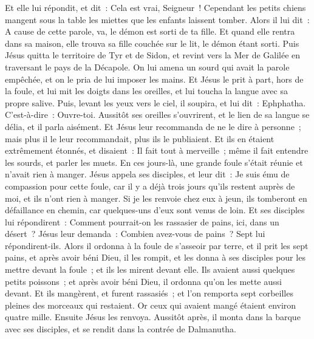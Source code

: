 \begin{multicols}{2}
Et elle lui répondit, et dit~: Cela est vrai, Seigneur~! Cependant les petits chiens mangent sous la table les miettes que les enfants laissent tomber.
Alors il lui dit~: A cause de cette parole, va, le démon est sorti de ta fille.
Et quand elle rentra dans sa maison, elle trouva sa fille couchée sur le lit, le démon étant sorti.
Puis Jésus quitta le territoire de Tyr et de Sidon, et revint vers la Mer de Galilée en traversant le pays de la Décapole.
On lui amena un sourd qui avait la parole empêchée, et on le pria de lui imposer les mains.
Et Jésus le prit à part, hors de la foule, et lui mit les doigts dans les oreilles, et lui toucha la langue avec sa propre salive.
Puis, levant les yeux vers le ciel, il soupira, et lui dit~: Ephphatha. C'est-à-dire~: Ouvre-toi.
Aussitôt ses oreilles s'ouvrirent, et le lien de sa langue se délia, et il parla aisément.
Et Jésus leur recommanda de ne le dire à personne~; mais plus il le leur recommandait, plus ils le publiaient.
Et ils en étaient extrêmement étonnés, et disaient~: Il fait tout à merveille~; même il fait entendre les sourds, et parler les muets.
\VerseOne{}En ces jours-là, une grande foule s'était réunie et n'avait rien à manger. Jésus appela ses disciples, et leur dit~:
Je suis ému de compassion pour cette foule, car il y a déjà trois jours qu'ils restent auprès de moi, et ils n'ont rien à manger.
Si je les renvoie chez eux à jeun, ils tomberont en défaillance en chemin, car quelques-uns d'eux sont venus de loin.
Et ses disciples lui répondirent~: Comment pourrait-on les rassasier de pains, ici, dans un désert~?
Jésus leur demanda~: Combien avez-vous de pains~? Sept lui répondirent-ils.
Alors il ordonna à la foule de s'asseoir par terre, et il prit les sept pains, et après avoir béni Dieu, il les rompit, et les donna à ses disciples pour les mettre devant la foule~; et ils les mirent devant elle.
Ils avaient aussi quelques petits poissons~; et après avoir béni Dieu, il ordonna qu'on les mette aussi devant.
Et ils mangèrent, et furent rassasiés~; et l'on remporta sept corbeilles pleines des morceaux qui restaient.
Or ceux qui avaient mangé étaient environ quatre mille. Ensuite Jésus les renvoya.
Aussitôt après, il monta dans la barque avec ses disciples, et se rendit dans la contrée de Dalmanutha.

\end{multicols}
